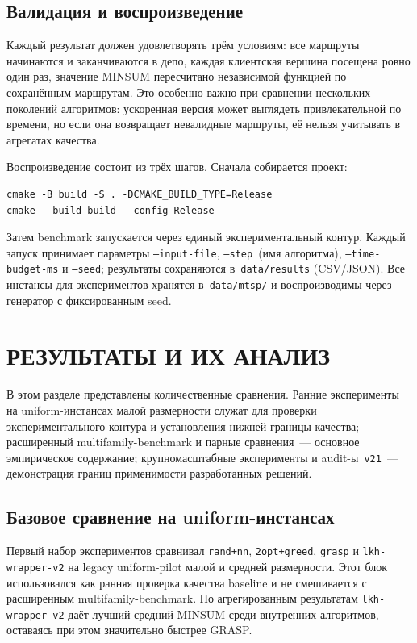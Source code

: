 \documentclass[14pt,a4paper]{extarticle}
\begin{document}
\subsection{Валидация и воспроизведение}

Каждый результат должен удовлетворять трём условиям: все маршруты начинаются и заканчиваются в депо, каждая клиентская вершина посещена ровно один раз, значение MINSUM пересчитано независимой функцией по сохранённым маршрутам. Это особенно важно при сравнении нескольких поколений алгоритмов: ускоренная версия может выглядеть привлекательной по времени, но если она возвращает невалидные маршруты, её нельзя учитывать в агрегатах качества.

Воспроизведение состоит из трёх шагов. Сначала собирается проект:
\begin{verbatim}
cmake -B build -S . -DCMAKE_BUILD_TYPE=Release
cmake --build build --config Release
\end{verbatim}
Затем benchmark запускается через единый экспериментальный контур. Каждый запуск принимает параметры \texttt{--input-file}, \texttt{--step}~(имя алгоритма), \texttt{--time-budget-ms} и \texttt{--seed}; результаты сохраняются в~\texttt{data/results} (CSV/JSON). Все инстансы для экспериментов хранятся в~\texttt{data/mtsp/} и воспроизводимы через генератор с фиксированным seed.


\section{РЕЗУЛЬТАТЫ И ИХ АНАЛИЗ}

В этом разделе представлены количественные сравнения. Ранние эксперименты на uniform-инстансах малой размерности служат для проверки экспериментального контура и установления нижней границы качества; расширенный multifamily-benchmark и парные сравнения~--- основное эмпирическое содержание; крупномасштабные эксперименты и audit-ы~\texttt{v21}~--- демонстрация границ применимости разработанных решений.

\subsection{Базовое сравнение на uniform-инстансах}

Первый набор экспериментов сравнивал \texttt{rand+nn}, \texttt{2opt+greed}, \texttt{grasp} и \texttt{lkh-wrapper-v2} на legacy uniform-pilot малой и средней размерности. Этот блок использовался как ранняя проверка качества baseline и не смешивается с расширенным multifamily-benchmark. По агрегированным результатам \texttt{lkh-wrapper-v2} даёт лучший средний MINSUM среди внутренних алгоритмов, оставаясь при этом значительно быстрее GRASP.
\end{document}
